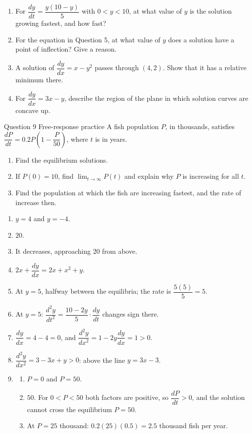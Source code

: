 \documentclass[11pt]{article}
\begin{document}
\begin{enumerate}[leftmargin=*,itemsep=2pt,start=5]
  \item For $\dfrac{dy}{dt}=\dfrac{y(10-y)}{5}$ with $0<y<10$, at what value of $y$ is the solution growing fastest, and how fast?\work{2.8cm}
  \item For the equation in Question 5, at what value of $y$ does a solution have a point of inflection? Give a reason.\work{2.8cm}
  \item A solution of $\dfrac{dy}{dx}=x-y^2$ passes through $(4,2)$. Show that it has a relative minimum there.\work{2.8cm}
  \item For $\dfrac{dy}{dx}=3x-y$, describe the region of the plane in which solution curves are concave up.\work{2.8cm}
\end{enumerate}

\begin{frbox}{Question 9 \textperiodcentered{} Free-response practice}
A fish population $P$, in thousands, satisfies $\dfrac{dP}{dt}=0.2P\left(1-\dfrac{P}{50}\right)$, where $t$ is in years.
\begin{enumerate}[label=(\alph*),leftmargin=*,itemsep=2pt]
  \item Find the equilibrium solutions.\work{2.6cm}
  \item If $P(0)=10$, find $\displaystyle\lim_{t\to\infty}P(t)$ and explain why $P$ is increasing for all $t$.\work{2.6cm}
  \item Find the population at which the fish are increasing fastest, and the rate of increase then.\work{2.6cm}
\end{enumerate}
\end{frbox}

\newpage
\begin{solbox}
\begin{enumerate}[leftmargin=*,itemsep=4pt]
  \item $y=4$ and $y=-4$.
  \item $20$.
  \item It decreases, approaching 20 from above.
  \item $2x+\dfrac{dy}{dx}=2x+x^2+y$.
  \item At $y=5$, halfway between the equilibria; the rate is $\dfrac{5(5)}{5}=5$.
  \item At $y=5$: $\dfrac{d^2y}{dt^2}=\dfrac{10-2y}{5}\cdot\dfrac{dy}{dt}$ changes sign there.
  \item $\dfrac{dy}{dx}=4-4=0$, and $\dfrac{d^2y}{dx^2}=1-2y\dfrac{dy}{dx}=1>0$.
  \item $\dfrac{d^2y}{dx^2}=3-3x+y>0$: above the line $y=3x-3$.
  \item \begin{enumerate}[label=(\alph*),leftmargin=*,itemsep=3pt]
    \item $P=0$ and $P=50$.
    \item $50$. For $0<P<50$ both factors are positive, so $\dfrac{dP}{dt}>0$, and the solution cannot cross the equilibrium $P=50$.
    \item At $P=25$ thousand: $0.2(25)(0.5)=2.5$ thousand fish per year.
  \end{enumerate}
\end{enumerate}
\end{solbox}
\end{document}
